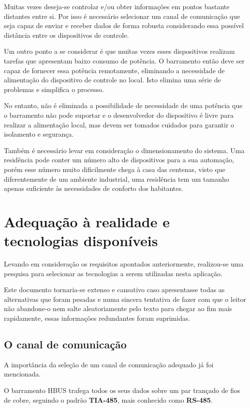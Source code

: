 \documentclass[11pt]{report}
\begin{document}
Muitas vezes deseja-se controlar e/ou obter informações em pontos bastante distantes entre si. Por isso é necessário selecionar um canal de comunicação que seja capaz de enviar e receber dados de forma robusta considerando essa possível distância entre os dispositivos de controle.

Um outro ponto a se considerar é que muitas vezes esses dispositivos realizam tarefas que apresentam baixo consumo de potência. O barramento então deve ser capaz de fornecer essa potência remotamente, eliminando a necessidade de alimentação do dispositivo de controle no local. Isto elimina uma série de problemas e simplifica o processo.

No entanto, não é eliminada a possibilidade de necessidade de uma potência que o barramento não pode suportar e o desenvolvedor do dispositivo é livre para realizar a alimentação local, mas devem ser tomados cuidados para garantir o isolamento e segurança.

Também é necessário levar em consideração o dimensionamento do sistema. Uma residência pode conter um número alto de dispositivos para a sua automação, porém esse número muito dificilmente chega à casa das centenas, visto que diferentemente de um ambiente industrial, uma residência tem um tamanho apenas suficiente às necessidades de conforto dos habitantes.

\section{Adequação à realidade e tecnologias disponíveis}

Levando em consideração os requisitos apontados anteriormente, realizou-se uma pesquisa para selecionar as tecnologias a serem utilizadas nesta aplicação. 

Este documento tornaria-se extenso e cansativo caso apresentasse todas as alternativas que foram pesadas e numa sincera tentativa de fazer com que o leitor não abandone-o nem salte aleatoriamente pelo texto para chegar ao fim mais rapidamente, essas informações redundantes foram suprimidas.

\subsection{O canal de comunicação}

A importância da seleção de um canal de comunicação adequado já foi mencionada.

O barramento HBUS trafega todos os seus dados sobre um par trançado de fios de cobre, seguindo o padrão \textbf{TIA-485}, mais conhecido como \textbf{RS-485}.
\end{document}
